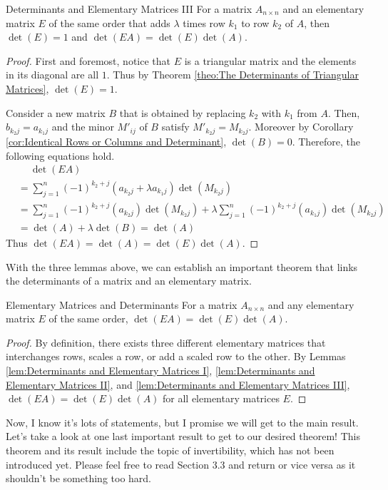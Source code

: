 \documentclass[../../main.tex]{subfiles}
\begin{document}
\begin{lemma}{}{Determinants and Elementary Matrices III}
For a matrix $A_{n \times n}$ and an elementary matrix $E$ of
the same order that adds $\lambda$ times row $k_1$ to row $k_2$
of $A$, then $\det(E) = 1$ and $\det(EA) = \det(E) \det(A)$.
\end{lemma}
\begin{proof}
First and foremost, notice that $E$ is a triangular matrix and
the elements in its diagonal are all $1$. Thus by Theorem
\ref{theo:The Determinants of Triangular Matrices}, $\det(E) = 1$.

Consider a new matrix $B$ that is obtained by replacing $k_2$
with $k_1$ from $A$. Then, $b_{k_2j} = a_{k_1j}$ and the minor
$M'_{ij}$ of $B$ satisfy $M'_{k_2j} = M_{k_2j}$. Moreover by Corollary
\ref{cor:Identical Rows or Columns and Determinant}, $\det(B) = 0$.
Therefore, the following equations hold.
\begin{align*}
    &\quad\ \det(EA) \\
    &= \sum_{j=1}^n (-1)^{k_2 + j} (a_{k_2j} + \lambda a_{k_1j})
        \det(M_{k_2j}) \\
    &= \sum_{j=1}^n (-1)^{k_2 + j} (a_{k_2j}) \det(M_{k_2j}) +
        \lambda \sum_{j=1}^n (-1)^{k_2 + j} (a_{k_1j})
            \det(M_{k_2j}) \\
    &= \det(A) + \lambda \det(B)
    = \det(A)
\end{align*}
Thus $\det(EA) = \det(A) = \det(E) \det(A)$.
\end{proof}

With the three lemmas above, we can establish an important theorem
that links the determinants of a matrix and an elementary matrix.

\begin{theorem}{}{Elementary Matrices and Determinants}
For a matrix $A_{n \times n}$ and any elementary matrix $E$ of the
same order, $\det(EA) = \det(E) \det(A)$.
\end{theorem}
\begin{proof}
By definition, there exists three different elementary matrices that
interchanges rows, scales a row, or add a scaled row to the other.
By Lemmas \ref{lem:Determinants and Elementary Matrices I},
\ref{lem:Determinants and Elementary Matrices II}, and
\ref{lem:Determinants and Elementary Matrices III}, $\det(EA) =
\det(E) \det(A)$ for all elementary matrices $E$.
\end{proof}

Now, I know it's lots of statements, but I promise we will get to
the main result. Let's take a look at one last important result to
get to our desired theorem! This theorem and its result include
the topic of invertibility, which has not been introduced yet. Please
feel free to read Section 3.3 and return or vice versa as it shouldn't
be something too hard.
\end{document}
